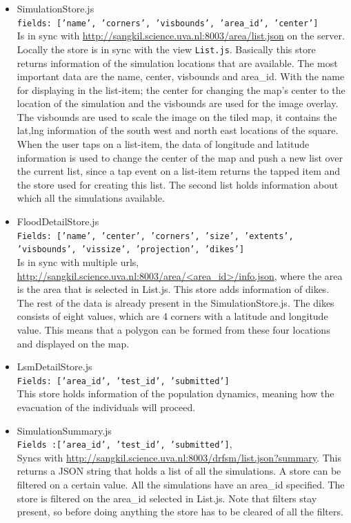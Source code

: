 \begin{itemize}
\item SimulationStore.js \\
\texttt{fields: ['name', 'corners', 'visbounds', 'area\_id', 'center']} \\
Is in sync with \url{http://sangkil.science.uva.nl:8003/area/list.json} on the server. Locally the store is in sync with the view \texttt{List.js}. Basically this store returns information of the simulation locations that are available. The most important data are the name, center, visbounds and area\_id. With the name for displaying in the list-item; the center for changing the map's center to the location of the simulation and the visbounds are used for the image overlay. The visbounds are used to scale the image on the tiled map, it contains the lat,lng information of the south west and north east locations of the square. When the user taps on a list-item, the data of longitude and latitude information is used to change the center of the map and push a new list over the current list, since a tap event on a list-item returns the tapped item and the store used for creating this list. The second list holds information about which all the simulations available.
\item FloodDetailStore.js \\
\texttt{Fields: ['name', 'center', 'corners', 'size', 'extents', \\
'visbounds', 'vissize', 'projection', 'dikes']} \\
Is in sync with multiple urls, \url{http://sangkil.science.uva.nl:8003/area/<area\_id>/info.json}, where the area is the area that is selected in List.js. This store adds information of dikes. The rest of the data is already present in the SimulationStore.js. The dikes consists of eight values, which are 4 corners with a latitude and longitude value. This means that a polygon can be formed from these four locations and displayed on the map.
\item LsmDetailStore.js \\
\texttt{Fields: ['area\_id', 'test\_id', 'submitted']} \\
This store holds information of the population dynamics, meaning how the evacuation of the individuals will proceed. 
\item SimulationSummary.js \\
\texttt{Fields :['area\_id', 'test\_id', 'submitted']},\\
Syncs with \url{http://sangkil.science.uva.nl:8003/drfsm/list.json?summary}. This returns a JSON string that holds a list of all the simulations. A store can be filtered on a certain value. All the simulations have an area\_id specified. The store is filtered on the area\_id selected in List.js. Note that filters stay present, so before doing anything the store has to be cleared of all the filters.

\end{itemize}
